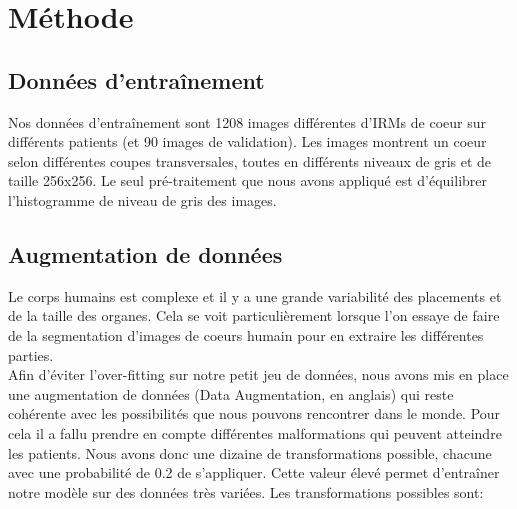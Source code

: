 \documentclass[french, english]{article}
\begin{document}
\paragraph{}



\section{Méthode}
\label{method}

\subsection{Données d'entraînement}
Nos données d'entraînement sont 1208 images différentes d'IRMs de coeur sur différents patients (et 90 images de validation). Les images montrent un coeur selon différentes coupes transversales, toutes en différents niveaux de gris et de taille 256x256. 
Le seul pré-traitement que nous avons appliqué est d'équilibrer l'histogramme de niveau de gris des images.

\subsection{Augmentation de données}

Le corps humains est complexe et il y a une grande variabilité des placements et de la taille des organes.
Cela se voit particulièrement lorsque l'on essaye de faire de la segmentation d'images de coeurs humain pour en extraire les différentes parties.\\
Afin d'éviter l'over-fitting sur notre petit jeu de données, nous avons mis en place une augmentation de données (Data Augmentation, en anglais) qui reste cohérente avec les possibilités que nous pouvons rencontrer dans le monde.
Pour cela il a fallu prendre en compte différentes malformations qui peuvent atteindre les patients.
Nous avons donc une dizaine de transformations possible, chacune avec une probabilité de 0.2 de s'appliquer. Cette valeur élevé permet d'entraîner notre modèle sur des données très variées.
Les transformations possibles sont:
\end{document}
